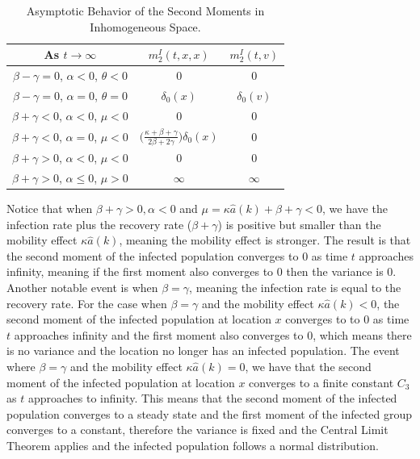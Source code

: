 \documentclass[sn-basic]{sn-jnl}%
\theoremstyle{thmstyleone}%
\theoremstyle{thmstyletwo}%
\theoremstyle{thmstylethree}%
\numberwithin{equation}{theorem}
\begin{document}
\begin{table}[ht]
\begin{tabular}{ | c | c | c |  }
\hline
 As $t \rightarrow \infty$ & $m_{2}^{I}(t,x,x)$ & $m_{2}^{I}(t,v) $\\
\hline
$\beta - \gamma=0$, $\alpha < 0$, $\theta < 0 $ &  $ 0$ & $ 0$\\ 
\hline
$\beta - \gamma=0$, $\alpha = 0$, $\theta = 0$ & $\delta_0(x)$ & $\delta_0(v)$ \\ 
\hline 
$\beta + \gamma < 0$, $\alpha < 0$, $\mu < 0$ & $ 0$ & $0$ \\ 
\hline
$\beta + \gamma < 0$, $\alpha = 0$, $\mu<0$ & $ \Big( \frac{\kappa+\beta+\gamma}{2\beta+2\gamma}\Big) \delta_0(x) $ & $ 0$ \\
\hline 
$\beta + \gamma > 0$, $\alpha < 0$, $\mu <0$ & $ 0$ & $ 0$ \\
\hline
$\beta + \gamma > 0$, $\alpha \leq 0$, $\mu>0$ & $ \infty$ & $\infty$ \\
\hline
\end{tabular}
\caption{Asymptotic Behavior of the Second Moments in Inhomogeneous Space. }
\label{tab:asymptotic sec moment inhomogeneous}
\end{table}



Notice that when $\beta + \gamma >0, \alpha < 0$ and $\mu = \kappa\hat{a}(k)+\beta+\gamma < 0$, we have the infection rate plus the recovery rate ($\beta+\gamma$) is positive but smaller than the mobility effect $\kappa\hat{a}(k)$, meaning the mobility effect is stronger. The result is that the second moment of the infected population converges to  $0$ as time $t$ approaches infinity, meaning if the first moment also converges to  $0$ then the variance is $0$. Another notable event is when $\beta=\gamma$, meaning the infection rate is equal to the recovery rate. For the case when $\beta=\gamma$ and the mobility effect $\kappa\hat{a}(k) < 0$, the second moment of the infected population at location $x$ converges to  to $0$ as time $t$ approaches infinity and the first moment also converges to $0$, which means there is no variance and the location no longer has an infected population. The event where $\beta=\gamma$ and the mobility effect $\kappa\hat{a}(k) = 0$, we have that the second moment of the infected population at location $x$ converges to  a finite constant $C_{3}$ as $t$ approaches to infinity. This means that the second moment of the infected population converges to a steady state and the first moment of the infected group converges to  a constant, therefore the variance is fixed and the Central Limit Theorem applies and the infected population follows a normal distribution.
\end{document}
